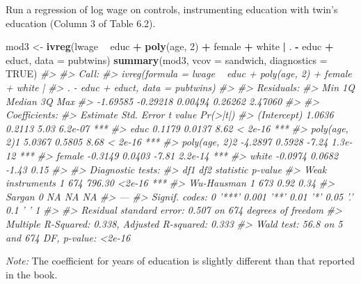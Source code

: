 \documentclass[]{book}
\newenvironment{Shaded}{\begin{snugshade}}{\end{snugshade}}
\newcommand{\CommentTok}[1]{\textcolor[rgb]{0.56,0.35,0.01}{\textit{#1}}}
\newcommand{\DataTypeTok}[1]{\textcolor[rgb]{0.13,0.29,0.53}{#1}}
\newcommand{\DecValTok}[1]{\textcolor[rgb]{0.00,0.00,0.81}{#1}}
\newcommand{\KeywordTok}[1]{\textcolor[rgb]{0.13,0.29,0.53}{\textbf{#1}}}
\newcommand{\NormalTok}[1]{#1}
\newcommand{\OperatorTok}[1]{\textcolor[rgb]{0.81,0.36,0.00}{\textbf{#1}}}
\newcommand{\OtherTok}[1]{\textcolor[rgb]{0.56,0.35,0.01}{#1}}
\newcommand{\StringTok}[1]{\textcolor[rgb]{0.31,0.60,0.02}{#1}}
\theoremstyle{definition}
\theoremstyle{definition}
\theoremstyle{definition}
\theoremstyle{remark}
\begin{document}
Run a regression of log wage on controls, instrumenting education with
twin's education (Column 3 of Table 6.2).

\begin{Shaded}
\begin{Highlighting}[]
\NormalTok{mod3 <-}\StringTok{ }\KeywordTok{ivreg}\NormalTok{(lwage }\OperatorTok{~}\StringTok{ }\NormalTok{educ }\OperatorTok{+}\StringTok{ }\KeywordTok{poly}\NormalTok{(age, }\DecValTok{2}\NormalTok{) }\OperatorTok{+}\StringTok{ }\NormalTok{female }\OperatorTok{+}\StringTok{ }\NormalTok{white }\OperatorTok{|}
\StringTok{                }\NormalTok{. }\OperatorTok{-}\StringTok{ }\NormalTok{educ }\OperatorTok{+}\StringTok{ }\NormalTok{educt, }\DataTypeTok{data =}\NormalTok{ pubtwins)}
\KeywordTok{summary}\NormalTok{(mod3, }\DataTypeTok{vcov =}\NormalTok{ sandwich, }\DataTypeTok{diagnostics =} \OtherTok{TRUE}\NormalTok{)}
\CommentTok{#> }
\CommentTok{#> Call:}
\CommentTok{#> ivreg(formula = lwage ~ educ + poly(age, 2) + female + white | }
\CommentTok{#>     . - educ + educt, data = pubtwins)}
\CommentTok{#> }
\CommentTok{#> Residuals:}
\CommentTok{#>      Min       1Q   Median       3Q      Max }
\CommentTok{#> -1.69585 -0.29218  0.00494  0.26262  2.47060 }
\CommentTok{#> }
\CommentTok{#> Coefficients:}
\CommentTok{#>               Estimate Std. Error t value Pr(>|t|)    }
\CommentTok{#> (Intercept)     1.0636     0.2113    5.03  6.2e-07 ***}
\CommentTok{#> educ            0.1179     0.0137    8.62  < 2e-16 ***}
\CommentTok{#> poly(age, 2)1   5.0367     0.5805    8.68  < 2e-16 ***}
\CommentTok{#> poly(age, 2)2  -4.2897     0.5928   -7.24  1.3e-12 ***}
\CommentTok{#> female         -0.3149     0.0403   -7.81  2.2e-14 ***}
\CommentTok{#> white          -0.0974     0.0682   -1.43     0.15    }
\CommentTok{#> }
\CommentTok{#> Diagnostic tests:}
\CommentTok{#>                  df1 df2 statistic p-value    }
\CommentTok{#> Weak instruments   1 674    796.30  <2e-16 ***}
\CommentTok{#> Wu-Hausman         1 673      0.92    0.34    }
\CommentTok{#> Sargan             0  NA        NA      NA    }
\CommentTok{#> ---}
\CommentTok{#> Signif. codes:  0 '***' 0.001 '**' 0.01 '*' 0.05 '.' 0.1 ' ' 1}
\CommentTok{#> }
\CommentTok{#> Residual standard error: 0.507 on 674 degrees of freedom}
\CommentTok{#> Multiple R-Squared: 0.338,   Adjusted R-squared: 0.333 }
\CommentTok{#> Wald test: 56.8 on 5 and 674 DF,  p-value: <2e-16}
\end{Highlighting}
\end{Shaded}

\emph{Note:} The coefficient for years of education is slightly
different than that reported in the book.
\end{document}
